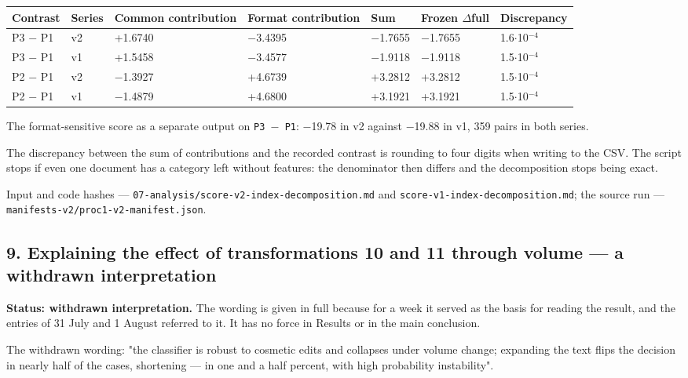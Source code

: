 \documentclass[11pt,a4paper]{article}
\renewcommand{\_}{\textunderscore\allowbreak}
\begin{document}
\begin{center}
\small
\begin{tabularx}{\textwidth}{llXllll}
\toprule
Contrast & Series & Common contribution & Format contribution & Sum & Frozen $\Delta$full & Discrepancy \\
\midrule
P3 $-$ P1 & v2 & +1.6740 & $-$3.4395 & $-$1.7655 & $-$1.7655 & 1.6$\cdot$10$^{-4}$ \\
P3 $-$ P1 & v1 & +1.5458 & $-$3.4577 & $-$1.9118 & $-$1.9118 & 1.5$\cdot$10$^{-4}$ \\
P2 $-$ P1 & v2 & $-$1.3927 & +4.6739 & +3.2812 & +3.2812 & 1.5$\cdot$10$^{-4}$ \\
P2 $-$ P1 & v1 & $-$1.4879 & +4.6800 & +3.1921 & +3.1921 & 1.5$\cdot$10$^{-4}$ \\
\bottomrule
\end{tabularx}
\end{center}

The format-sensitive score as a separate output on \texttt{P3 $-$ P1}: $-$19.78 in v2 against $-$19.88 in v1, 359 pairs in both series.

The discrepancy between the sum of contributions and the recorded contrast is rounding to four digits when writing to the CSV. The script stops if even one document has a category left without features: the denominator then differs and the decomposition stops being exact.

Input and code hashes — \texttt{07-\allowbreak{}analysis/score-\allowbreak{}v2-\allowbreak{}index-\allowbreak{}decomposition.md} and \texttt{score-\allowbreak{}v1-\allowbreak{}index-\allowbreak{}decomposition.md}; the source run — \texttt{manifests-\allowbreak{}v2/proc1-\allowbreak{}v2-\allowbreak{}manifest.json}.

\subsection{9. Explaining the effect of transformations 10 and 11 through volume — a withdrawn interpretation}

\textbf{Status: withdrawn interpretation.} The wording is given in full because for a week
it served as the basis for reading the result, and the entries of 31 July and
1 August referred to it. It has no force in Results or in the main conclusion.

The withdrawn wording: "the classifier is robust to cosmetic edits and collapses
under volume change; expanding the text flips the decision in nearly half of the
cases, shortening — in one and a half percent, with high probability instability".
\end{document}
